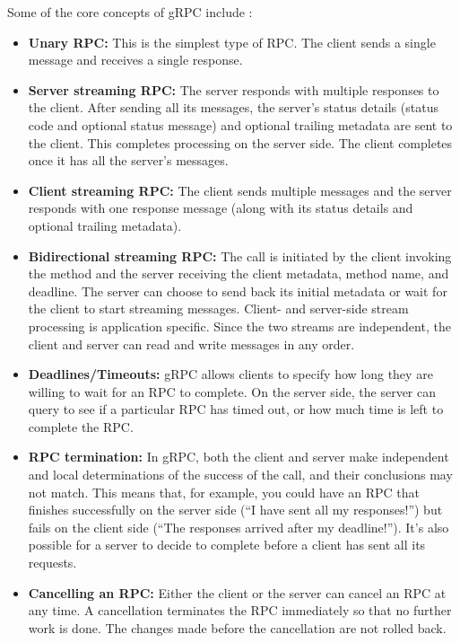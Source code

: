 	Some of the core concepts of gRPC include \cite{grpcspec2}:
	\begin{itemize}
		\item \textbf{Unary RPC:} This is the simplest type of RPC. The client sends a single message and receives a single response. 
		\item \textbf{Server streaming RPC:} The server responds with multiple responses to the client. 
		After sending all its messages, the server’s status details (status code and optional status message) and optional trailing metadata are sent to the client.
		This completes processing on the server side. The client completes once it has all the server’s messages.
		\item \textbf{Client streaming RPC:} The client sends multiple messages and the server responds with one response message (along with its status details and optional trailing metadata). 
		\item \textbf{Bidirectional streaming RPC:} The call is initiated by the client invoking the method and the server receiving the client metadata, method name, and deadline. The server can choose to send back its initial metadata or wait for the client to start streaming messages.
		Client- and server-side stream processing is application specific. Since the two streams are independent, the client and server can read and write messages in any order.
		\item \textbf{Deadlines/Timeouts:} gRPC allows clients to specify how long they are willing to wait for an RPC to complete. On the server side, the server can query to see if a particular RPC has timed out, or how much time is left to complete the RPC.
		\item \textbf{RPC termination:} In gRPC, both the client and server make independent and local determinations of the success of the call, and their conclusions may not match. This means that, for example, you could have an RPC that finishes successfully on the server side (“I have sent all my responses!”) but fails on the client side (“The responses arrived after my deadline!”). It’s also possible for a server to decide to complete before a client has sent all its requests.
		\item \textbf{Cancelling an RPC:} Either the client or the server can cancel an RPC at any time. A cancellation terminates the RPC immediately so that no further work is done. The changes made before the cancellation are not rolled back.
	\end{itemize}

